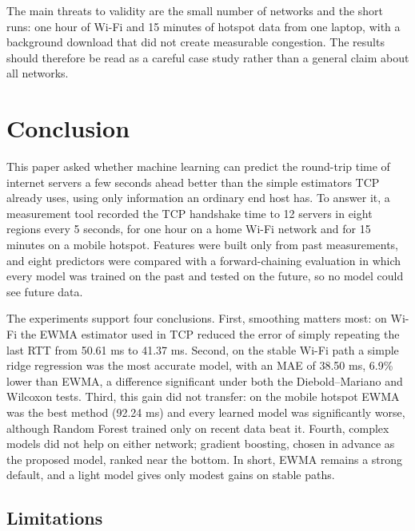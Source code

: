 \documentclass[pdflatex,sn-mathphys-num]{sn-jnl}
\begin{document}
The main threats to validity are the small number of networks and the short runs: one hour of Wi-Fi and 15 minutes of hotspot data from one laptop, with a background download that did not create measurable congestion. The results should therefore be read as a careful case study rather than a general claim about all networks.

\section{Conclusion}\label{sec:conclusion}

This paper asked whether machine learning can predict the round-trip time of internet servers a few seconds ahead better than the simple estimators TCP already uses, using only information an ordinary end host has. To answer it, a measurement tool recorded the TCP handshake time to 12 servers in eight regions every 5 seconds, for one hour on a home Wi-Fi network and for 15 minutes on a mobile hotspot. Features were built only from past measurements, and eight predictors were compared with a forward-chaining evaluation in which every model was trained on the past and tested on the future, so no model could see future data.

The experiments support four conclusions. First, smoothing matters most: on Wi-Fi the EWMA estimator used in TCP reduced the error of simply repeating the last RTT from 50.61 ms to 41.37 ms. Second, on the stable Wi-Fi path a simple ridge regression was the most accurate model, with an MAE of 38.50 ms, 6.9\% lower than EWMA, a difference significant under both the Diebold--Mariano and Wilcoxon tests. Third, this gain did not transfer: on the mobile hotspot EWMA was the best method (92.24 ms) and every learned model was significantly worse, although Random Forest trained only on recent data beat it. Fourth, complex models did not help on either network; gradient boosting, chosen in advance as the proposed model, ranked near the bottom. In short, EWMA remains a strong default, and a light model gives only modest gains on stable paths.

\subsection{Limitations}\label{sec:limits}
\end{document}
